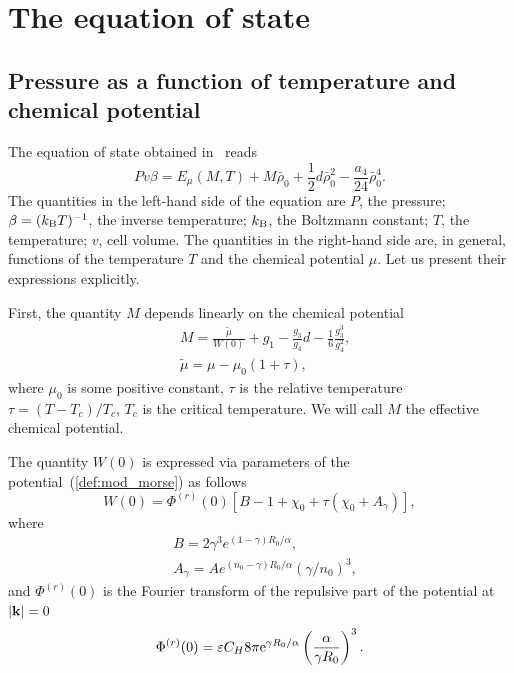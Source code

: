 \section{\label{sec:eos}The equation of state}
\subsection{Pressure as a function of temperature and chemical potential}
The equation of state obtained in~\cite{KozlovskiiDobush2020} reads
\begin{equation}
	\label{eq:eosMT}
	Pv\beta = E_\mu(M, T) + M \bar \rho_0 + \frac{1}{2} d \bar \rho_0^2 - \frac{a_4}{24} \bar \rho_0^4.
\end{equation}
The quantities in the left-hand side of the equation are $P$, the pressure; $\beta = (k_{\rm B} T)^{-1}$, the inverse temperature; $k_{\rm B}$, the Boltzmann constant; $T$, the temperature; $v$, cell volume. The quantities in the right-hand side are, in general, functions of the temperature $T$ and the chemical potential $\mu$. Let us present their expressions explicitly.

First, the quantity $M$ depends linearly on the chemical potential
\begin{align}\label{chem_pot}
	&	M = \frac{\tilde\mu}{W(0)} + g_1 - \frac{g_3}{g_4} d - \frac{1}{6} \frac{g_3^3}{g_4^2}, \\
	&	\tilde\mu=\mu-\mu_0(1+\tau),
\end{align}
where $\mu_0$ is some positive constant, $\tau$ is the relative temperature $\tau = (T - T_c) / T_c$, $T_c$ is the critical temperature. We will call $M$ the effective chemical potential.

The quantity $W(0)$ is expressed via parameters of the potential~(\ref{def:mod_morse}) as follows
\begin{equation}
	W(0) = \Phi^{(r)}(0) \left[ B - 1 + \chi_0 + \tau (\chi_0 + A_\gamma) \right],
\end{equation}
where
\begin{align*} 
	& B = 2 \gamma^3 e^{(1-\gamma)R_0/\alpha},
	\nonumber \\
	& A_\gamma = A e^{(n_0-\gamma)R_0/\alpha} \left( \gamma / n_0\right)^3, 
\end{align*}
and $\Phi^{(r)}(0)$ is the Fourier transform of the repulsive part of the potential at $\abs{\vb k}=0$
\begin{equation*}
	\Phi^{(r)}(0) = \varepsilon C_H 8\pi {\rm e}^{\gamma R_0/\alpha} \left(\frac{\alpha}{\gamma R_0}\right)^3.
\end{equation*}

